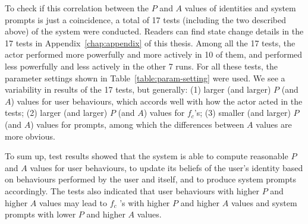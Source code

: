 To check if this correlation between the $P$ and $A$ values of identities and system prompts is just a coincidence, a total of 17 tests (including the two described above) of the system were conducted. Readers can find state change details in the 17 tests in Appendix~\ref{chap:appendix} of this thesis. Among all the 17 tests, the actor performed more powerfully and more actively in 10 of them, and performed less powerfully and less actively in the other 7 runs. For all these tests, the parameter settings shown in Table~\ref{table:param-setting} were used. We see a variability in results of the 17 tests, but generally:
(1) larger (and larger) $P$ (and $A$) values for user behaviours, which accords well with how the actor acted in the tests;
(2) larger (and larger) $P$ (and $A$) values for $f_c$'s;
(3) smaller (and larger) $P$ (and $A$) values for prompts, among which the differences between $A$ values are more obvious.

To sum up, test results showed that the system is able to compute reasonable $P$ and $A$ values for user behaviours, to update its beliefs of the user's identity based on behaviours performed by the user and itself, and to produce system prompts accordingly. The tests also indicated that user behaviours with higher $P$ and higher $A$ values may lead to $f_c$ 's with higher $P$ and higher $A$ values and system prompts with lower $P$ and higher $A$ values.
